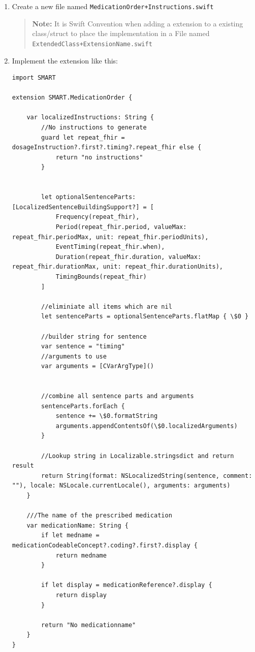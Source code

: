 \documentclass{article}
\begin{document}
\begin{enumerate}

\item
Create a new file named \texttt{MedicationOrder+Instructions.swift}
\begin{quote}
  \textbf{Note:} It is Swift Convention when adding a
  extension to a existing class/struct to place the implementation in a
  File named \texttt{ExtendedClass+ExtensionName.swift}
\end{quote}

\item Implement the extension like this:
\begin{verbatim}
import SMART

extension SMART.MedicationOrder {

    var localizedInstructions: String {
        //No instructions to generate
        guard let repeat_fhir = dosageInstruction?.first?.timing?.repeat_fhir else {
            return "no instructions"
        }


        let optionalSentenceParts: [LocalizedSentenceBuildingSupport?] = [
            Frequency(repeat_fhir),
            Period(repeat_fhir.period, valueMax: repeat_fhir.periodMax, unit: repeat_fhir.periodUnits),
            EventTiming(repeat_fhir.when),
            Duration(repeat_fhir.duration, valueMax: repeat_fhir.durationMax, unit: repeat_fhir.durationUnits),
            TimingBounds(repeat_fhir)
        ]

        //eliminiate all items which are nil
        let sentenceParts = optionalSentenceParts.flatMap { \$0 }

        //builder string for sentence
        var sentence = "timing"
        //arguments to use
        var arguments = [CVarArgType]()


        //combine all sentence parts and arguments
        sentenceParts.forEach {
            sentence += \$0.formatString
            arguments.appendContentsOf(\$0.localizedArguments)
        }

        //Lookup string in Localizable.stringsdict and return result
        return String(format: NSLocalizedString(sentence, comment: ""), locale: NSLocale.currentLocale(), arguments: arguments)
    }

    ///The name of the prescribed medication
    var medicationName: String {
        if let medname = medicationCodeableConcept?.coding?.first?.display {
            return medname
        }

        if let display = medicationReference?.display {
            return display
        }

        return "No medicationname"
    }
}
\end{verbatim}
\end{enumerate}
\end{document}

